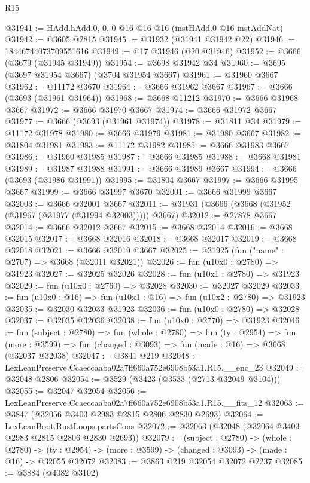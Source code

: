 \begin{lexlean}{R15}
\begin{coremodule}
@31941 := HAdd.hAdd.{0, 0, 0} @16 @16 @16 (instHAdd.{0} @16 instAddNat)
@31942 := @3605 @2815
@31945 := @31932 (@31941 @31942 @22)
@31946 := 18446744073709551616
@31949 := @17 @31946 (@20 @31946)
@31952 := @3666 (@3679 (@31945 @31949))
@31954 := @3698 @31942 @34
@31960 := @3695 (@3697 @31954 @3667) (@3704 @31954 @3667)
@31961 := @31960 @3667
@31962 := @11172 @3670
@31964 := @3666 @31962 @3667
@31967 := @3666 (@3693 (@31961 @31964))
@31968 := @3668 @11212
@31970 := @3666 @31968 @3667
@31972 := @3666 @31970 @3667
@31974 := @3666 @31972 @3667
@31977 := @3666 (@3693 (@31961 @31974))
@31978 := @31811 @34
@31979 := @11172 @31978
@31980 := @3666 @31979
@31981 := @31980 @3667
@31982 := @31804 @31981
@31983 := @11172 @31982
@31985 := @3666 @31983 @3667
@31986 := @31960 @31985
@31987 := @3666 @31985
@31988 := @3668 @31981
@31989 := @31987 @31988
@31991 := @3666 @31989 @3667
@31994 := @3666 (@3693 (@31986 @31991))
@31995 := @31804 @3667
@31997 := @3666 @31995 @3667
@31999 := @3666 @31997 @3670
@32001 := @3666 @31999 @3667
@32003 := @3666 @32001 @3667
@32011 := @31931 (@3666 (@3668 (@31952 (@31967 (@31977 (@31994 @32003))))) @3667)
@32012 := @27878 @3667
@32014 := @3666 @32012 @3667
@32015 := @3668 @32014
@32016 := @3668 @32015
@32017 := @3668 @32016
@32018 := @3668 @32017
@32019 := @3668 @32018
@32021 := @3666 @32019 @3667
@32025 := @31925 (fun ("name" : @2707) => @3668 (@32011 @32021))
@32026 := fun (u10x0 : @2780) => @31923
@32027 := @32025 @32026
@32028 := fun (u10x1 : @2780) => @31923
@32029 := fun (u10x0 : @2760) => @32028
@32030 := @32027 @32029
@32033 := fun (u10x0 : @16) => fun (u10x1 : @16) => fun (u10x2 : @2780) => @31923
@32035 := @32030 @32033 @31923
@32036 := fun (u10x0 : @2780) => @32028
@32037 := @32035 @32036
@32038 := fun (u10x0 : @2770) => @31923
@32046 := fun (subject : @2780) =>
  fun (whole : @2780) =>
  fun (ty : @2954) =>
  fun (more : @3599) => fun (changed : @3093) => fun (made : @16) => @3668 (@32037 @32038)
@32047 := @3841 @219
@32048 := LexLeanPreserve.Ccaeccaaba02a7ff660a752e6908b53a1.R15.__enc_23
@32049 := @32048 @2806
@32054 := @3529 (@3423 (@3533 (@2713 @32049 @3104)))
@32055 := @32047 @32054
@32056 := LexLeanPreserve.Ccaeccaaba02a7ff660a752e6908b53a1.R15.__fits_12
@32063 := @3847 (@32056 @3403 @2983 @2815 @2806 @2830 @2693)
@32064 := LexLeanBoot.RustLoops.partsCons
@32072 := @32063 (@32048 (@32064 @3403 @2983 @2815 @2806 @2830 @2693))
@32079 := (subject : @2780) ->
  (whole : @2780) ->
  (ty : @2954) -> (more : @3599) -> (changed : @3093) -> (made : @16) -> @32055 @32072
@32083 := @3863 @219 @32054 @32072 @2237
@32085 := @3884 (@4082 @3102)

\end{coremodule}
\end{lexlean}
